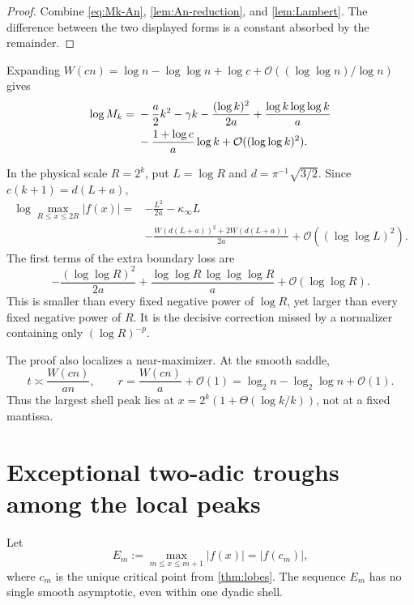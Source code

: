 \documentclass[11pt,oneside]{article}
\theoremstyle{definition}
\theoremstyle{remark}
\newcommand{\bigO}{\mathcal O}
\newcommand{\LambertW}{W}
\begin{document}
\begin{proof}
Combine \eqref{eq:Mk-An}, \cref{lem:An-reduction}, and
\cref{lem:Lambert}.  The difference between the two displayed forms is a
constant absorbed by the remainder.
\end{proof}

Expanding
$\LambertW(cn)=\log n-\log\log n+\log c+\bigO((\log\log n)/\log n)$ gives
\begin{align}
 \log M_k={}&-\frac a2k^2-\gamma k
 -\frac{(\log k)^2}{2a}
 +\frac{\log k\log\log k}{a}
 \notag\\
 &-\frac{1+\log c}{a}\log k
 +\bigO((\log\log k)^2).
 \label{eq:annular-expanded}
\end{align}

In the physical scale $R=2^k$, put $L=\log R$ and
$d=\pi^{-1}\sqrt{3/2}$.  Since $c(k+1)=d(L+a)$,
\begin{equation}
 \begin{split}
 \log\max_{R\le x\le2R}|f(x)|
 ={}&-\frac{L^2}{2a}-\kappa_\infty L\\
 &-\frac{\LambertW(d(L+a))^2+2\LambertW(d(L+a))}{2a}
 +\bigO((\log\log L)^2).
 \end{split}
 \label{eq:annular-R}
\end{equation}
The first terms of the extra boundary loss are
\begin{equation}
 -\frac{(\log\log R)^2}{2a}
 +\frac{\log\log R\,\log\log\log R}{a}
 +\bigO(\log\log R).
 \label{eq:second-lognormal}
\end{equation}
This is smaller than every fixed negative power of $\log R$, yet larger than
every fixed negative power of $R$.  It is the decisive correction missed by a
normalizer containing only $(\log R)^{-p}$.

The proof also localizes a near-maximizer.  At the smooth saddle,
\begin{equation}
 t\asymp\frac{\LambertW(cn)}{an},
 \qquad
 r=\frac{\LambertW(cn)}a+\bigO(1)
 =\log_2n-\log_2\log n+\bigO(1).
 \label{eq:max-location}
\end{equation}
Thus the largest shell peak lies at
$x=2^k(1+\Theta(\log k/k))$, not at a fixed mantissa.

\section{Exceptional two-adic troughs among the local peaks}
\label{sec:two-adic}

Let
\begin{equation}
 E_m:=\max_{m\le x\le m+1}|f(x)|=|f(c_m)|,
 \label{eq:Em}
\end{equation}
where $c_m$ is the unique critical point from \cref{thm:lobes}.  The sequence
$E_m$ has no single smooth asymptotic, even within one dyadic shell.
\end{document}
